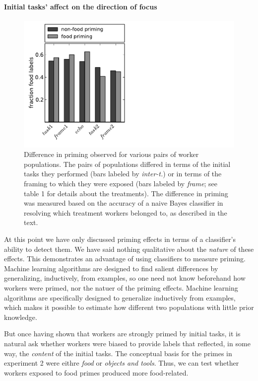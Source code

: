 \documentclass[12pt]{article}
\begin{document}
\paragraph{Initial tasks' affect on the direction of focus} 
\begin{figure}
	\centering
	\includegraphics[scale=1]{figs/food_specificity.pdf}
	\caption{
		Difference in priming observed for various pairs of worker populations.
		The pairs of populations differed in terms of the initial tasks they
		performed (bars labeled by \textit{inter-t.}) or in terms of the framing
		to which they were exposed (bars labeled by \textit{frame}; see table 1 for
		details about the treatments).  The difference in priming was 
		measured based on the accuracy of a naive Bayes classifier in 
		resolving which treatment workers belonged to, as described in the 
		text.  
	}
	\label{fig:food_specificity}
\end{figure}

At this point we have only discussed priming effects in terms of a 
classifier's ability to detect them.
We have said nothing qualitative about the \textit{nature} of these effects.  
This demonstrates an advantage of using classifiers to measure priming.  
Machine learning algorithms are designed to find salient differences 
by generalizing, inductively, from examples, so one
need not know beforehand how workers were primed, nor the natuer of the  
priming effects.  Machine learning algorithms are specifically designed to 
generalize inductively from examples, which makes
it possible to estimate how different two populations with little prior 
knowledge.

But once having shown that workers are strongly primed by initial tasks, it is
natural ask whether workers were biased to provide labels that reflected, 
in some way, the \textit{content} of the initial tasks.  The conceptual basis
for the primes in experiment 2 were eithre \textit{food} or 
\textit{objects and tools}.  Thus, we can test whether workers exposed to food
primes produced more food-related.  
\end{document}
